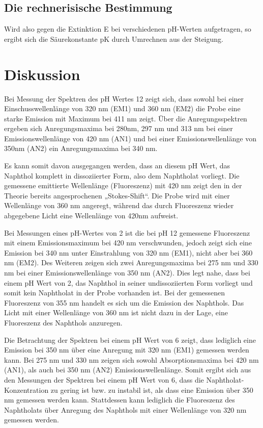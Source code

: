 \documentclass[12pt]{article}
\begin{document}
\subsection{Die rechnerisische Bestimmung}

Wird
also gegen die Extinktion E bei verschiedenen pH-Werten aufgetragen,
so ergibt sich die Säurekonstante pK durch Umrechnen aus der Steigung. 

\section{Diskussion}

Bei Messung der Spektren des pH Wertes 12 zeigt sich, dass sowohl bei einer Einschusswellenlänge von 320 nm (EM1) und
360 nm (EM2) die Probe eine starke Emission mit Maximum bei 411 nm zeigt. Über die Anregungsspektren
ergeben sich Anregungsmaxima bei 280nm, 297 nm und 313 nm bei einer Emissionswellenlänge von 420 nm (AN1)
und bei einer Emissionswellenlänge von 350nm (AN2) ein Anregungsmaxima bei 340 nm.

Es kann somit davon ausgegangen werden, dass an diesem pH Wert, das Naphthol komplett in dissoziierter Form, also dem Naphtholat vorliegt.
Die gemessene emittierte Wellenlänge (Fluoreszenz) mit 420 nm zeigt den in der Theorie bereits angesprochenen „Stokes-Shift“.
Die Probe wird mit einer Wellenlänge von 360 nm angeregt, während das durch Fluoreszenz wieder abgegebene
Licht eine Wellenlänge von 420nm aufweist.


Bei Messungen eines pH-Wertes von 2 ist die bei pH 12 gemessene Fluoreszenz mit einem Emissionsmaximum bei 420 nm verschwunden,
jedoch zeigt sich eine Emission bei 340 nm unter Einstrahlung von 320 nm (EM1), nicht aber bei 360 nm (EM2).
Des Weiteren zeigen sich zwei Anregungsmaxima bei 275 nm und 330 nm bei einer Emissionswellenlänge von 350 nm (AN2).
Dies legt nahe, dass bei einem pH Wert von 2, das Naphthol in seiner undissoziierten Form vorliegt
und somit kein Naphtholat in der Probe vorhanden ist. Bei der gemessenen Fluoreszenz von 355 nm handelt
es sich um die Emission des Naphthols. Das Licht mit einer Wellenlänge von 360 nm ist nicht dazu in der Lage,
eine Fluoreszenz des Naphthols anzuregen.


Die Betrachtung der Spektren bei einem pH Wert von 6 zeigt, dass lediglich eine Emission bei 350 nm
über eine Anregung mit 320 nm (EM1) gemessen werden kann. Bei 275 nm und 330 nm zeigen sich sowohl Absorptionsmaxima bei 420 nm (AN1),
als auch bei 350 nm (AN2) Emissionswellenlänge.
Somit ergibt sich aus den Messungen der Spektren bei einem pH Wert von 6,
dass die Naphtholat-Konzentration zu gering ist bzw. zu instabil ist,
als dass eine Emission über 350 nm gemessen werden kann.
Stattdessen kann lediglich die Fluoreszenz des Naphtholats
über Anregung des Naphthols mit einer Wellenlänge von 320 nm gemessen werden.
\end{document}
